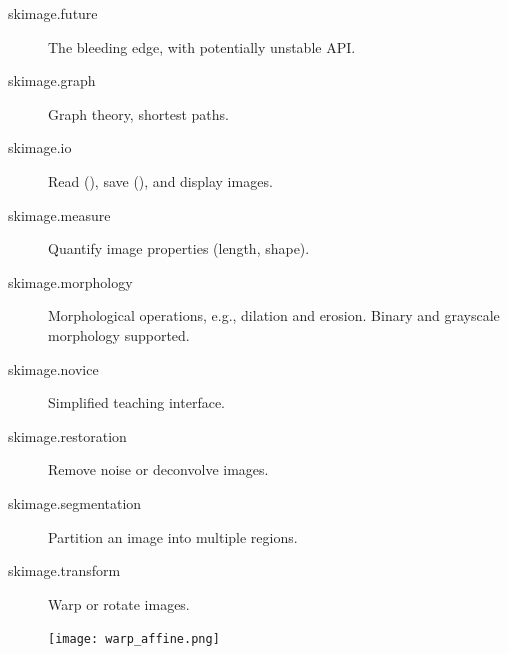 \documentclass[nohyper, %
               ]{tufte-handout}
\newcommand{\eg}{e.g.\xspace}
\newcommand{\pyblue}[1]{\textcolor{DarkBlue}{\pyv{#1}}}
\begin{document}
\begin{description}
    \item[skimage.future] The bleeding edge, with potentially unstable API.
    \item[skimage.graph] Graph theory, shortest paths.
    \item[skimage.io] Read (), save (), and display images.
    \item[skimage.measure] Quantify image properties (length, shape).
    \item[skimage.morphology] Morphological operations, \eg, dilation and erosion. Binary and grayscale morphology supported.
    \item[skimage.novice] Simplified teaching interface.
    \item[skimage.restoration] Remove noise or deconvolve images.
    \item[skimage.segmentation] Partition an image into multiple regions.
    \item[skimage.transform] Warp or rotate images.
    \begin{description}
      \begin{marginfigure}[0cm]%
        \texttt{[image: warp\_affine.png]}%
        \label{fig:affine}%
      \end{marginfigure}%

\end{description}
\end{description}
\end{document}
